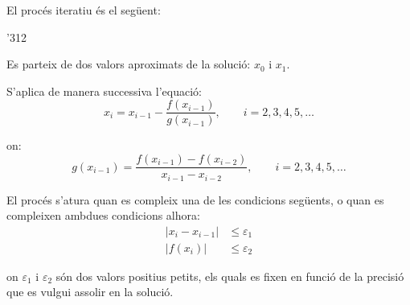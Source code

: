 \begin{center}
    
    \label{pic:metode-secant}
\end{center}


El procés iteratiu és el següent:

\begin{dingautolist}{'312}
    \item Es parteix de dos valors aproximats de la solució: $x_0$ i $x_1$.

    \item   S'aplica de manera successiva l'equació:
            \begin{equation}\label{eq:secant-1}
              x_i = x_{i-1} - \frac{f(x_{i-1})}{g(x_{i-1})}, \qquad i=2,3,4,5, \dots
            \end{equation}

            on:
            \begin{equation}\label{eq:secant-2}
              g(x_{i-1}) = \frac{f(x_{i-1}) - f(x_{i-2}) } {x_{i-1} - x_{i-2}}, \qquad i=2,3,4, 5, \dots
            \end{equation}

    \item   El procés s'atura quan es compleix una de les condicions següents, o quan es compleixen ambdues condicions alhora:
            \begin{subequations}\begin{align}
              |x_i - x_{i-1}| &\leq \varepsilon_1 \\
              |f(x_i)| &\leq \varepsilon_2
            \end{align}\end{subequations}

            on $\varepsilon_1$ i $\varepsilon_2$ són dos valors positius petits, els quals es fixen en funció de la precisió que es vulgui assolir en la solució.
\end{dingautolist}


